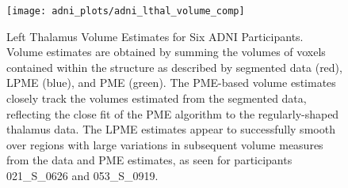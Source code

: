 \documentclass[11pt,reqno]{article}
\theoremstyle{definition}
\begin{document}
\begin{figure}[h]
  \centering
  \texttt{[image: adni\_plots/adni\_lthal\_volume\_comp]}
  \caption{Left Thalamus Volume Estimates for Six ADNI Participants. Volume estimates are obtained by summing the volumes of voxels contained within the structure as described by segmented data (red), LPME (blue), and PME (green). The PME-based volume estimates closely track the volumes estimated from the segmented data, reflecting the close fit of the PME algorithm to the regularly-shaped thalamus data. The LPME estimates appear to successfully smooth over regions with large variations in subsequent volume measures from the data and PME estimates, as seen for participants 021\_S\_0626 and 053\_S\_0919.}
  \label{fig:lthal_volume_comparison}
\end{figure}
\end{document}
